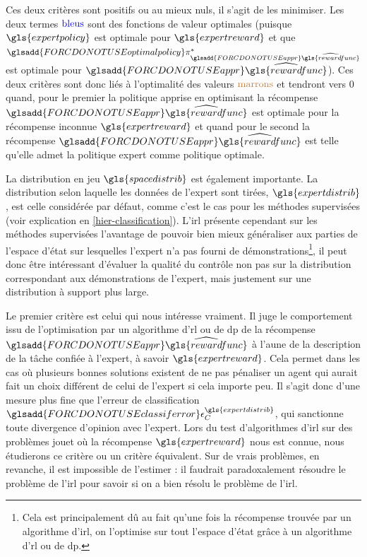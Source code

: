 \documentclass[frenchb,a4paper,justified,notoc]{tufte-book}
\newcommand{\rewardfunc}{\gls{rewardfunc}}
\newcommand{\expertreward}{\gls{expertreward}}
\newcommand{\expertpolicy}{\gls{expertpolicy}}
\newcommand{\spacedistrib}{\gls{spacedistrib}}
\newcommand{\expertdistrib}{\gls{expertdistrib}}
\newcommand{\appr}[1]{\ensuremath{\glsadd{FORCDONOTUSEappr}\widehat{#1}}}
\newcommand{\classiferror}[1]{\ensuremath{\glsadd{FORCDONOTUSEclassiferror}\epsilon_C^{#1}}}
\newcommand{\optimalpolicy}[1]{\ensuremath{\glsadd{FORCDONOTUSEoptimalpolicy}\pi^*_{#1}}}
\begin{document}
Ces deux critères sont positifs ou au mieux nuls, il s'agit de les minimiser. Les deux termes $\textrm{\color{blue}bleus}$ sont des fonctions de valeur optimales (puisque $\expertpolicy$ est optimale pour $\expertreward$ et que $\optimalpolicy{\appr{\rewardfunc}}$ est optimale pour $\appr{\rewardfunc}$). Ces deux critères sont donc liés à l'optimalité des valeurs $\textrm{\color{brown}marrons}$ et tendront vers $0$ quand, pour le premier la politique apprise en optimisant la récompense $\appr{\rewardfunc}$ est optimale pour la récompense inconnue $\expertreward$ et quand pour le second la récompense $\appr{\rewardfunc}$ est telle qu'elle admet la politique expert comme politique optimale.

La distribution en jeu $\spacedistrib$ est également importante. La distribution selon laquelle les données de l'expert sont tirées, $\expertdistrib$, est celle considérée par défaut, comme c'est le cas pour les méthodes supervisées (voir explication en \autoref{hier-classification}). L'\gls{irl} présente cependant sur les méthodes supervisées l'avantage de pouvoir bien mieux généraliser aux parties de l'espace d'état sur lesquelles l'expert n'a pas fourni de démonstrations\footnote{Cela est principalement dû au fait qu'une fois la récompense trouvée par un algorithme d'\gls{irl}, on l'optimise sur tout l'espace d'état grâce à un algorithme d'\gls{rl} ou de \gls{dp}.
 }, il peut donc être intéressant d'évaluer la qualité du contrôle non pas sur la distribution correspondant aux démonstrations de l'expert, mais justement sur une distribution à support plus large.

Le premier critère est celui qui nous intéresse vraiment. Il juge le comportement issu de l'optimisation par un algorithme d'\gls{rl} ou de \gls{dp} de la récompense $\appr{\rewardfunc}$ à l'aune de la description de la tâche confiée à l'expert, à savoir $\expertreward$. Cela permet dans les cas où plusieurs bonnes solutions existent de ne pas pénaliser un agent qui aurait fait un choix différent de celui de l'expert si cela importe peu. Il s'agit donc d'une mesure plus fine que l'erreur de classification $\classiferror{\expertdistrib}$, qui sanctionne toute divergence d'opinion avec l'expert. Lors du test d'algorithmes d'\gls{irl} sur des problèmes jouet où la récompense $\expertreward$ nous est connue, nous étudierons ce critère ou un critère équivalent. Sur de vrais problèmes, en revanche, il est impossible de l'estimer : il faudrait paradoxalement résoudre le problème de l'\gls{irl} pour savoir si on a bien résolu le problème de l'\gls{irl}.
\end{document}
